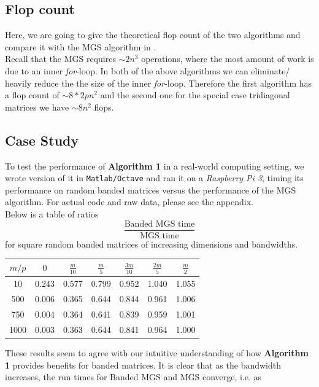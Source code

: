 \documentclass{article}
\numberwithin{pic}{section}
\numberwithin{lem}{section}
\numberwithin{thm}{section}
\numberwithin{cor}{section}
\theoremstyle{definition}
\numberwithin{ex}{section}
\numberwithin{defn}{section}
\theoremstyle{definition}
\theoremstyle{remark}
\newcommand{\Frac}[2]{\displaystyle \frac{#1}{#2}}
\newlength\tindent
\renewcommand{\indent}{\hspace*{\tindent}}
\begin{document}
\subsection{Flop count}
\indent Here, we are going to give the theoretical flop count of the two algorithms and compare it with the MGS algorithm in \cite{nla}.\\
\indent Recall that the MGS requires $\sim 2n^3$ operations, where the most amount of work is due to an inner \textit{for}-loop.
In both of the above algorithms we can eliminate/ heavily reduce the the size of the inner \textit{for}-loop.
Therefore the first algorithm has a flop count of $\sim 8*2pn^2$ and the second
one for the special case tridiagonal matrices we have $\sim 8n^2$ flops.
\subsection{Case Study}
\indent To test the performance of \textbf{Algorithm 1} in a real-world
computing setting, we wrote version of it in \texttt{Matlab/Octave} and ran it
on a \textit{Raspberry Pi 3}, timing its performance on random banded matrices versus
the performance of the MGS algorithm. For actual code and raw data, please see
the appendix.\\
\indent Below is a table of ratios 
\begin{equation*}
  \Frac{\text{Banded MGS time}}{\text{MGS time}}
\end{equation*}
for square random banded matrices of increasing dimensions and bandwidths.
\begin{center}
  \begin{tabular}{|| c || c | c | c | c | c | c ||}
    \hline
    $m / p$ & $0$ & $\frac{m}{10}$ & $\frac{m}{5}$ & $\frac{3m}{10}$ & $\frac{2m}{5}$ & $\frac{m}{2}$\\
    \hline\hline
    10 & 0.243 & 0.577 & 0.799 & 0.952 & 1.040 & 1.055\\
    \hline
    500 & 0.006 & 0.365 & 0.644 & 0.844 & 0.961 & 1.006\\
    \hline
750 & 0.004 & 0.364 & 0.641 & 0.839 & 0.959 & 1.001\\
    \hline
1000 & 0.003 & 0.363 & 0.644 & 0.841 & 0.964 & 1.000\\
    \hline
  \end{tabular}
\end{center}
\indent These results seem to agree with our intuitive understanding of how
\textbf{Algorithm 1} provides benefits for banded matrices. It is clear that as
the bandwidth increases, the run times for Banded MGS and MGS converge, i.e. as
\end{document}
